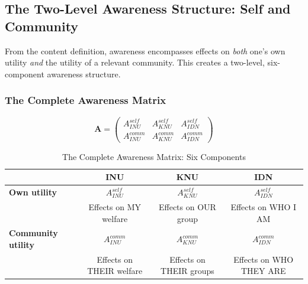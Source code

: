 \subsection{The Two-Level Awareness Structure: Self and Community}
\label{subsec:11-4-two-level-structure}


From the content definition, awareness encompasses effects on \emph{both}
one's own utility \emph{and} the utility of a relevant community. This
creates a two-level, six-component awareness structure.

\subsubsection{The Complete Awareness Matrix}

\begin{equation}
\boxed{
\mathbf{A} = \begin{pmatrix}
A^{self}_{INU} & A^{self}_{KNU} & A^{self}_{IDN} \\
A^{comm}_{INU} & A^{comm}_{KNU} & A^{comm}_{IDN}
\end{pmatrix}
}
\label{eq:awareness-matrix}
\end{equation}

\begin{table}[htbp]
\centering
\caption{The Complete Awareness Matrix: Six Components}
\label{tab:awareness-matrix-complete}
\renewcommand{\arraystretch}{1.5}
\begin{tabular}{@{}l|ccc@{}}
\toprule
& \textbf{INU} & \textbf{KNU} & \textbf{IDN} \\
\midrule
\textbf{Own utility} & $A^{self}_{INU}$ & $A^{self}_{KNU}$ & $A^{self}_{IDN}$ \\
& Effects on MY welfare & Effects on OUR group & Effects on WHO I AM \\
\midrule
\textbf{Community utility} & $A^{comm}_{INU}$ & $A^{comm}_{KNU}$ & $A^{comm}_{IDN}$ \\
& Effects on THEIR welfare & Effects on THEIR groups & Effects on WHO THEY ARE \\
\bottomrule
\end{tabular}
\end{table}

